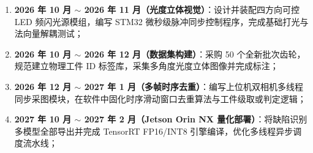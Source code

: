\begin{enumerate}
    \item \textbf{2026 年 10 月 $\sim$ 2026 年 11 月（光度立体视觉）}：设计并装配四方向可控 LED 频闪光源模组，编写 STM32 微秒级脉冲同步控制程序，完成基础打光与法向量解耦测试；
    \item \textbf{2026 年 10 月 $\sim$ 2026 年 12 月（数据集构建）}：采购 50 个全新批次齿轮，规范建立物理工件 ID 标签库，采集多角度光度立体图像并完成标注；
    \item \textbf{2026 年 12 月 $\sim$ 2027 年 1 月（多帧时序去重）}：编写上位机双相机多线程同步采图模块，在软件中固化时序滑动窗口去重算法与工件级取或判定逻辑；
    \item \textbf{2027 年 10 月 $\sim$ 2027 年 2 月（Jetson Orin NX 量化部署）}：将缺陷识别多模型全部导出并完成 TensorRT FP16/INT8 引擎编译，优化多线程异步调度流水线；
\end{enumerate}



